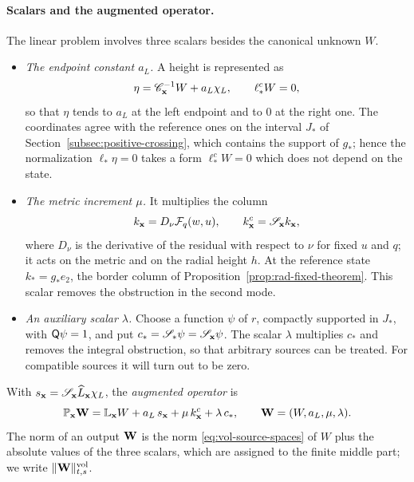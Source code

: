 \paragraph{Scalars and the augmented operator.}
The linear problem involves three scalars besides the canonical
unknown $W$.
\begin{itemize}
\item \emph{The endpoint constant $a_L$.} A height is represented as
 \[
  \eta=\mathscr C_{\mathbf x}^{-1}W+a_L\chi_L,\qquad \ell_*^cW=0 ,
 \]
 so that $\eta$ tends to $a_L$ at the left endpoint and to $0$ at the
 right one. The coordinates agree with the reference ones on the
 interval $J_*$ of Section~\ref{subsec:positive-crossing}, which
 contains the support of $g_*$; hence the normalization
 $\ell_*\eta=0$ takes a form $\ell_*^cW=0$ which does not depend on
 the state.
\item \emph{The metric increment $\mu$.} It multiplies the column
 \[
  k_{\mathbf x}=D_\nu\mathcal F_q(w,u),\qquad
  k_{\mathbf x}^c=\mathscr S_{\mathbf x}k_{\mathbf x},
 \]
 where $D_\nu$ is the derivative of the residual with respect to
 $\nu$ for fixed $u$ and $q$; it acts on the metric and on the
 radial height $h$. At the reference state $k_*=g_*e_2$, the border
 column of Proposition~\ref{prop:rad-fixed-theorem}. This scalar
 removes the obstruction in the second mode.
\item \emph{An auxiliary scalar $\lambda$.} Choose a function $\psi$
 of $r$, compactly supported in $J_*$, with $\mathsf Q\psi=1$, and put
 $c_*=\mathscr S_*\psi=\mathscr S_{\mathbf x}\psi$. The scalar $\lambda$
 multiplies $c_*$ and removes the integral obstruction, so that
 arbitrary sources can be treated. For compatible sources it will
 turn out to be zero.
\end{itemize}
With $s_{\mathbf x}=\mathscr S_{\mathbf x}\widehat L_{\mathbf x}\chi_L$, the
\emph{augmented operator} is
\begin{equation}\label{eq:vol-abstract-complete-operator}
 \mathbb P_{\mathbf x}\mathbf W
 =\mathbb L_{\mathbf x}W+a_L\,s_{\mathbf x}+\mu\,k_{\mathbf x}^c+\lambda\,c_*,
 \qquad \mathbf W=(W,a_L,\mu,\lambda) .
\end{equation}
The norm of an output $\mathbf W$ is the norm \eqref{eq:vol-source-spaces}
of $W$ plus the absolute values of the three scalars, which are
assigned to the finite middle part; we write
$\|\mathbf W\|^{\rm vol}_{t,s}$.

